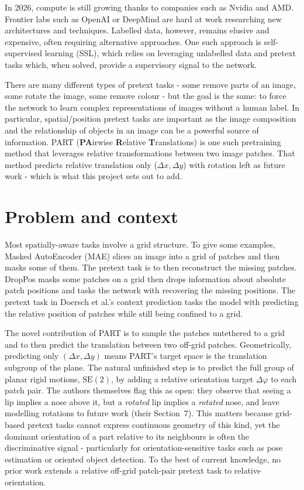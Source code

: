 \documentclass[11pt,a4paper]{report}
\begin{document}
In 2026, compute is still growing thanks to companies such as Nvidia and AMD. Frontier labs such as OpenAI or DeepMind are hard at work researching new architectures and techniques. Labelled data, however, remains elusive and expensive, often requiring alternative approaches. One such approach is self-supervised learning (SSL), which relies on leveraging unlabelled data and pretext tasks which, when solved, provide a supervisory signal to the network.

There are many different types of pretext tasks - some remove parts of an image, some rotate the image, some remove colour - but the goal is the same: to force the network to learn complex representations of images without a human label. In particular, spatial/position pretext tasks are important as the image composition and the relationship of objects in an image can be a powerful source of information. PART (\textbf{PA}irwise \textbf{R}elative \textbf{T}ranslations) is one such pretraining method that leverages relative transformations between two image patches. That method predicts relative translation only ($\Delta x,\Delta y$) with rotation left as future work - which is what this project sets out to add.

\section{Problem and context}
Most spatially-aware tasks involve a grid structure. To give some examples, Masked AutoEncoder (MAE) slices an image into a grid of patches and then masks some of them. The pretext task is to then reconstruct the missing patches. DropPos masks some patches on a grid then drops information about absolute patch positions and tasks the network with recovering the missing positions. The pretext task in Doersch et al.'s context prediction tasks the model with predicting the relative position of patches while still being confined to a grid. 

The novel contribution of PART is to sample the patches untethered to a grid and to then predict the translation between two off-grid patches. Geometrically, predicting only $(\Delta x, \Delta y)$ means PART's target space is the translation subgroup of the plane. The natural unfinished step is to predict the full group of planar rigid motions, $\mathrm{SE}(2)$, by adding a relative orientation target $\Delta\varphi$ to each patch pair. The authors themselves flag this as open: they observe that seeing a lip implies a nose above it, but a \emph{rotated} lip implies a \emph{rotated} nose, and leave modelling rotations to future work (their Section~7). This matters because grid-based pretext tasks cannot express continuous geometry of this kind, yet the dominant orientation of a part relative to its neighbours is often the discriminative signal - particularly for orientation-sensitive tasks such as pose estimation or oriented object detection. To the best of current knowledge, no prior work extends a relative off-grid patch-pair pretext task to relative orientation.
\end{document}
